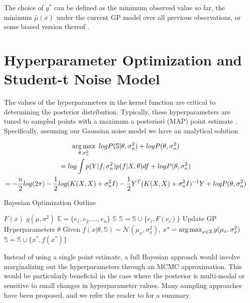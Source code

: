 The choice of $y^*$ can be defined as the minimum observed value so far, the minimum $\bar{\mu}(x)$ under the current GP model over all previous observations, or some biased version thereof \citep{Lizotte:2008:PBO:1626686}. 

\section{Hyperparameter Optimization and Student-t Noise Model}
\label{gp_hyperparam}
The values of the hyperparameters in the kernel function are critical to determining the posterior distribution. Typically, these hyperparameters are tuned to sampled points with a maximum a posteriori (MAP) point estimate \citep{NIPS2012_4522,GPstuff}. Specifically, assuming our Gaussian noise model we have an analytical solution

\begin{gather}
\operatorname*{arg\,max}_{\theta, \sigma_n^2} \text{ } log P(\mathbb{S}\vert \theta, \sigma_n^2) + log P(\theta, \sigma_n^2)\\
=log \int p(Y\vert f, \sigma_n^2)p(f\vert X,\theta)df + log P(\theta, \sigma_n^2)\nonumber\\
= -\frac{n}{2}log(2\pi) - \frac{1}{2}log(K(X,X) + \sigma_n^2 I) - \frac{1}{2}Y^T(K(X,X) + \sigma_n^2 I)^{-1}Y + log P(\theta, \sigma_n^2)\nonumber
\end{gather}


\begin{algorithm}[t]
\caption{Bayesian Optimization Outline}
\label{alg:bayesopt}
\begin{algorithmic}
\State {} $F(x)$
\State {} $g(\mu, \sigma^2)$
\State {} $\mathbb{E} = \{e_1, e_2, ..., e_n\}$
\State {} $\mathbb{S}$
  \State $\mathbb{S} = \mathbb{S} \cup \{e_i, F(e_i)\}$
\End
{}
  \State Update GP Hyperparameters $\theta$
  \State Given $f(x\vert \theta, \mathbb{S}) \sim \mathcal{N}(\mu_x, \sigma_x^2)$,
  \State $x^* = \operatorname*{arg\,max}_{x \in \mathbb{X}} g(\mu_x, \sigma_x^2)$
  \State $\mathbb{S} = \mathbb{S} \cup \{x^*, f(x^*)\}$
\End
\end{algorithmic}
\end{algorithm}


Instead of using a single point estimate, a full Bayesian approach would involve marginalizing out the hyperparameters through an MCMC approximation. This would be particularly beneficial in the case where the posterior is multi-modal or sensitive to small changes in hyperparameter values. Many sampling approaches have been proposed, and we refer the reader to \cite[Chapter~14]{barber2011bayesian} for a summary. 

